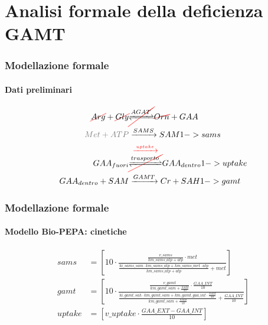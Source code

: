 \section{Analisi formale della deficienza GAMT}

\begin {frame}
\frametitle {Modellazione formale}
\framesubtitle{Dati preliminari}

	{
		\begin{align}
		{\color{red}\cancel{\color{black}Arg}} + {\color{red}\cancel{\color{black}Gly}}\nonumber &{\color{red}\cancel{\color{black}\xrightleftharpoons{AGAT}}} {\color{red}\cancel{\color{black}Orn}} + GAA\\
		{\color{gray}Met + ATP} &\xrightarrow{SAMS} SAM\label<1->{sams}\\
		GAA_{fuori} &{\color{red}\overset{\xrightarrow{uptake}}{\cancel{\color{black}\xrightleftharpoons{trasporto}}}} GAA_{dentro}\label<1->{uptake}\\
		GAA_{dentro} + SAM &\xrightarrow{GAMT} Cr + SAH\label<1->{gamt}
		\end{align}
		}


\end{frame}

\iffalse

\begin {frame}
\frametitle {Modellazione formale}
\framesubtitle{Modello Bio-PEPA: cinetiche}
\begin{align*}
	sams &= \left [10 \cdot \frac{\frac{v\_sams}{km\_sams\_atp + atp} \cdot met}{\frac{ki\_sams\_sam \cdot km\_sams\_atp + km\_sams\_met \cdot atp}{km\_sams\_atp + atp} + met} \right ]\\
	gamt &= \left [10 \cdot \frac{\frac{v\_gamt}{km\_gamt\_sam + \frac{SAM}{10}} \cdot \frac{GAA\_INT}{10}}{\frac{ki\_gamt\_sah \cdot km\_gamt\_sam + km\_gamt\_gaa\_int \cdot \frac{SAM}{10}}{km\_gamt\_sam + \frac{SAM}{10}} + \frac{GAA\_INT}{10}}\right ]\\
	uptake &= \left [v\_uptake \cdot \frac{GAA\_EXT - GAA\_INT}{10} \right ]
\end{align*}
\end{frame}

